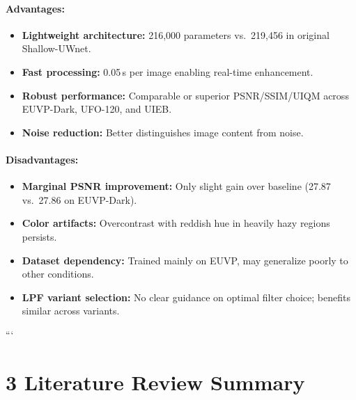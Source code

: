 \documentclass{article}
\begin{document}
\paragraph{Advantages:}
\begin{itemize}
    \item \textbf{Lightweight architecture:} 216,000 parameters vs.\ 219,456 in original Shallow-UWnet.
    \item \textbf{Fast processing:} 0.05\,s per image enabling real-time enhancement.
    \item \textbf{Robust performance:} Comparable or superior PSNR/SSIM/UIQM across EUVP-Dark, UFO-120, and UIEB.
    \item \textbf{Noise reduction:} Better distinguishes image content from noise.
\end{itemize}

\paragraph{Disadvantages:}
\begin{itemize}
    \item \textbf{Marginal PSNR improvement:} Only slight gain over baseline (27.87 vs.\ 27.86 on EUVP-Dark).
    \item \textbf{Color artifacts:} Overcontrast with reddish hue in heavily hazy regions persists.
    \item \textbf{Dataset dependency:} Trained mainly on EUVP, may generalize poorly to other conditions.
    \item \textbf{LPF variant selection:} No clear guidance on optimal filter choice; benefits similar across variants.
\end{itemize}
```

\section*{3 Literature Review Summary}
\end{document}
